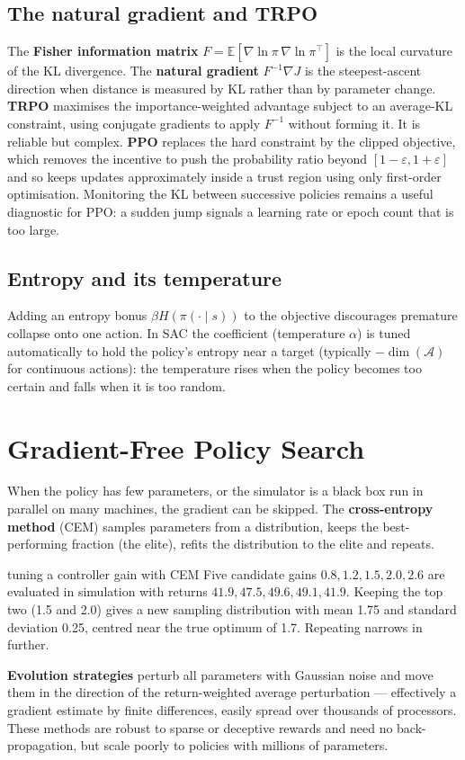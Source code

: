 \documentclass[11pt]{article}
\begin{document}
\subsection{The natural gradient and TRPO}
The \textbf{Fisher information matrix} $F=\mathbb E[\nabla\ln\pi\,\nabla\ln\pi^\top]$ is the local curvature of the KL divergence. The \textbf{natural gradient} $F^{-1}\nabla J$ is the steepest-ascent direction when distance is measured by KL rather than by parameter change. \textbf{TRPO} maximises the importance-weighted advantage subject to an average-KL constraint, using conjugate gradients to apply $F^{-1}$ without forming it. It is reliable but complex. \textbf{PPO} replaces the hard constraint by the clipped objective, which removes the incentive to push the probability ratio beyond $[1-\varepsilon,1+\varepsilon]$ and so keeps updates approximately inside a trust region using only first-order optimisation. Monitoring the KL between successive policies remains a useful diagnostic for PPO: a sudden jump signals a learning rate or epoch count that is too large.
\subsection{Entropy and its temperature}
Adding an entropy bonus $\beta H(\pi(\cdot\mid s))$ to the objective discourages premature collapse onto one action. In SAC the coefficient (temperature $\alpha$) is tuned automatically to hold the policy's entropy near a target (typically $-\dim(\mathcal A)$ for continuous actions): the temperature rises when the policy becomes too certain and falls when it is too random.

\section{Gradient-Free Policy Search}
When the policy has few parameters, or the simulator is a black box run in parallel on many machines, the gradient can be skipped. The \textbf{cross-entropy method} (CEM) samples parameters from a distribution, keeps the best-performing fraction (the elite), refits the distribution to the elite and repeats.
\begin{example}{tuning a controller gain with CEM}
Five candidate gains $0.8,1.2,1.5,2.0,2.6$ are evaluated in simulation with returns $41.9,47.5,49.6,49.1,41.9$. Keeping the top two (1.5 and 2.0) gives a new sampling distribution with mean 1.75 and standard deviation 0.25, centred near the true optimum of 1.7. Repeating narrows in further.
\end{example}
\textbf{Evolution strategies} perturb all parameters with Gaussian noise and move them in the direction of the return-weighted average perturbation --- effectively a gradient estimate by finite differences, easily spread over thousands of processors. These methods are robust to sparse or deceptive rewards and need no back-propagation, but scale poorly to policies with millions of parameters.
\end{document}
